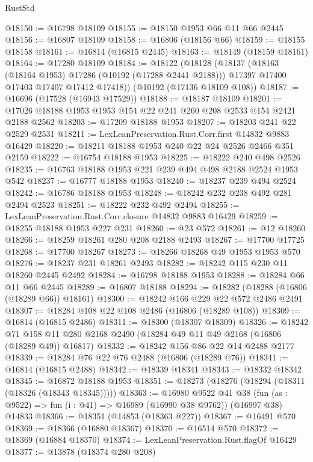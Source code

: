 \begin{lexlean}{RustStd}
\begin{coremodule}
@18150 := @16798 @18109
@18155 := @18150 @1953 @66 @11 @66 @2445
@18156 := @16807 @18109
@18158 := @16806 (@18156 @66)
@18159 := @18155 @18158
@18161 := @16814 (@16815 @2445)
@18163 := @18149 (@18159 @18161)
@18164 := @17280 @18109
@18184 := @18122
    (@18128
      (@18137
        (@18163 (@18164 @1953) @17286 (@10192 (@17288 @2441 @2188)))
        @17397
        @17400
        @17403
        @17407
        @17412
        @17418))
    (@10192 (@17136 @18109 @108))
@18187 := @16696 (@17528 (@16943 @17529))
@18188 := @18187 @18109
@18201 := @17026 @18188 @1953 @1953 @154 @22 @241 @260 @208 @2533 @154 @2421 @2188 @2562
@18203 := @17209 @18188 @1953
@18207 := @18203 @241 @22 @2529 @2531
@18211 := LexLeanPreservation.Rust.Corr.first @14832 @9883 @16429
@18220 := @18211 @18188 @1953 @240 @22 @24 @2526 @2466 @351 @2159
@18222 := @16754 @18188 @1953
@18225 := @18222 @240 @498 @2526
@18235 := @16763 @18188 @1953 @221 @239 @494 @498 @2188 @2524 @1953 @542
@18237 := @16777 @18188 @1953
@18240 := @18237 @239 @494 @2524
@18242 := @16786 @18188 @1953
@18248 := @18242 @232 @238 @492 @281 @2494 @2523
@18251 := @18222 @232 @492 @2494
@18255 := LexLeanPreservation.Rust.Corr.closure @14832 @9883 @16429
@18259 := @18255 @18188 @1953 @227 @231
@18260 := @23 @572
@18261 := @12 @18260
@18266 := @18259 @18261 @280 @208 @2188 @2493
@18267 := @17700 @17725
@18268 := @17700 @18267
@18273 := @18266 @18268 @49 @1953 @1953 @570
@18276 := @18237 @231 @18261 @2493
@18282 := @18242 @115 @230 @11 @18260 @2445 @2492
@18284 := @16798 @18188 @1953
@18288 := @18284 @66 @11 @66 @2445
@18289 := @16807 @18188
@18294 := @18282 (@18288 (@16806 (@18289 @66)) @18161)
@18300 := @18242 @166 @229 @22 @572 @2486 @2491
@18307 := @18284 @108 @22 @108 @2486 (@16806 (@18289 @108))
@18309 := @16814 (@16815 @2486)
@18311 := @18300 (@18307 @18309)
@18326 := @18242
    @71
    @158
    @11
    @280
    @2168
    @2490
    (@18284 @49 @11 @49 @2168 (@16806 (@18289 @49)) @16817)
@18332 := @18242 @156 @86 @22 @14 @2488 @2177
@18339 := @18284 @76 @22 @76 @2488 (@16806 (@18289 @76))
@18341 := @16814 (@16815 @2488)
@18342 := @18339 @18341
@18343 := @18332 @18342
@18345 := @16872 @18188 @1953
@18351 := @18273 (@18276 (@18294 (@18311 (@18326 (@18343 @18345)))))
@18363 := @16980
    @9522
    @41
    @38
    (fun (as : @9522) => fun (i : @41) => @16989 (@16990 @38 @9762))
    (@16997 @38)
    @14833
@18366 := @18351 (@14853 (@18363 @227))
@18367 := @16491 @570
@18369 := @18366 (@16880 @18367)
@18370 := @16514 @570
@18372 := @18369 (@16884 @18370)
@18374 := LexLeanPreservation.Rust.flagOf @16429
@18377 := @13878 (@18374 @280 @208)

\end{coremodule}
\end{lexlean}
